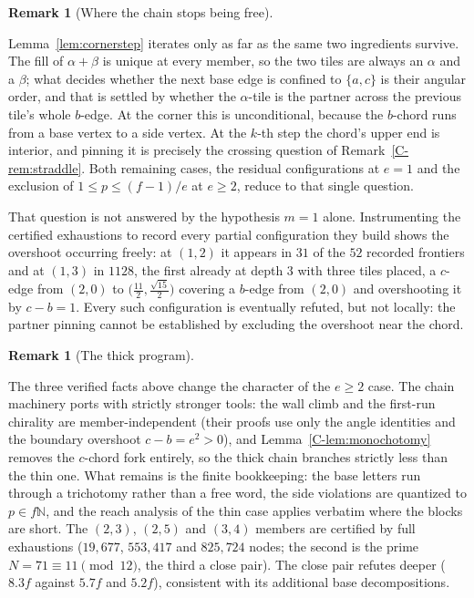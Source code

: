 \documentclass[11pt,reqno]{amsart}
\theoremstyle{plain}
\theoremstyle{definition}
\newtheorem{remark}[theorem]{Remark}
\begin{document}
\begin{remark}[Where the chain stops being free]\label{O-chainobstruction}

Lemma~\ref{lem:cornerstep} iterates only as far as the same two ingredients survive. The fill of
$\alpha+\beta$ is unique at every member, so the two tiles are always an $\alpha$ and a $\beta$;
what decides whether the next base edge is confined to $\{a,c\}$ is their angular order, and that
is settled by whether the $\alpha$-tile is the partner across the previous tile's whole $b$-edge.
At the corner this is unconditional, because the $b$-chord runs from a base vertex to a side
vertex. At the $k$-th step the chord's upper end is interior, and pinning it is precisely the
crossing question of Remark~\ref{C-rem:straddle}. Both remaining cases, the residual configurations
at $e=1$ and the exclusion of $1\le p\le(f-1)/e$ at $e\ge2$, reduce to that single question.

That question is not answered by the hypothesis $m=1$ alone. Instrumenting the certified
exhaustions to record every partial configuration they build shows the overshoot occurring
freely: at $(1,2)$ it appears in $31$ of the $52$ recorded frontiers and at $(1,3)$ in $1128$,
the first already at depth $3$ with three tiles placed, a $c$-edge from $(2,0)$ to
$\bigl(\tfrac{11}2,\tfrac{\sqrt{15}}2\bigr)$ covering a $b$-edge from $(2,0)$ and overshooting
it by $c-b=1$. Every such configuration is eventually refuted, but not locally: the partner
pinning cannot be established by excluding the overshoot near the chord.
\end{remark}

\begin{remark}[The thick program]\label{O-thickprogram}

The three verified facts above change the character of the $e\ge2$ case. The chain machinery
ports with strictly stronger tools: the wall climb and the first-run chirality are
member-independent (their proofs use only the angle identities and the boundary overshoot
$c-b=e^2>0$), and Lemma~\ref{C-lem:monochotomy} removes the $c$-chord fork entirely, so the thick
chain branches strictly less than the thin one. What remains is the finite bookkeeping: the base
letters run through a trichotomy rather than a free word, the side violations are quantized to
$p\in f\mathbb{N}$, and the reach analysis of the thin case applies verbatim where the blocks are
short. The $(2,3)$, $(2,5)$ and $(3,4)$ members are certified by full exhaustions ($19{,}677$,
$553{,}417$ and $825{,}724$ nodes; the second is the prime $N=71\equiv11\pmod{12}$, the third a
close pair). The close pair refutes deeper ($8.3f$ against $5.7f$ and $5.2f$), consistent with
its additional base decompositions.
\end{remark}
\end{document}
